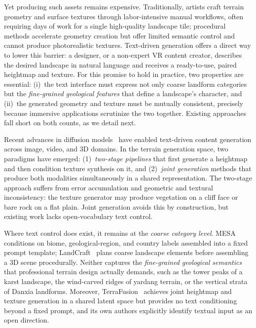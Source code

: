 \documentclass[review]{vgtc}                 %
\begin{document}
Yet producing such assets remains expensive.
Traditionally, artists craft terrain geometry and surface textures through labor-intensive manual workflows, often requiring days of work for a single high-quality landscape tile; procedural methods accelerate geometry creation but offer limited semantic control and cannot produce photorealistic textures.
Text-driven generation offers a direct way to lower this barrier: a designer, or a non-expert VR content creator, describes the desired landscape in natural language and receives a ready-to-use, paired heightmap and texture.
For this promise to hold in practice, two properties are essential: (i)~the text interface must express not only coarse landform categories but the \emph{fine-grained geological features} that define a landscape's character, and (ii)~the generated geometry and texture must be mutually consistent, precisely because immersive applications scrutinize the two together.
Existing approaches fall short on both counts, as we detail next.

Recent advances in diffusion models~\cite{DDPM:2020,LDM:2022} have enabled text-driven content generation across image, video, and 3D domains.
In the terrain generation space, two paradigms have emerged:
(1)~\emph{two-stage pipelines} that first generate a heightmap and then condition texture synthesis on it, and
(2)~\emph{joint generation} methods that produce both modalities simultaneously in a shared representation.
The two-stage approach suffers from error accumulation and geometric and textural inconsistency: the texture generator may produce vegetation on a cliff face or bare rock on a flat plain.
Joint generation avoids this by construction, but existing work lacks open-vocabulary text control.

Where text control does exist, it remains at the \emph{coarse category level}.
MESA~\cite{MESA:2025} conditions on biome, geological-region, and country labels assembled into a fixed prompt template; LandCraft~\cite{LandCraft:2026} plans coarse landscape elements before assembling a 3D scene procedurally.
Neither captures the \emph{fine-grained geological semantics} that professional terrain design actually demands, such as the tower peaks of a karst landscape, the wind-carved ridges of yardang terrain, or the vertical strata of Danxia landforms.
Moreover, TerraFusion~\cite{TerraFusion:2025} achieves joint heightmap and texture generation in a shared latent space but provides no text conditioning beyond a fixed prompt, and its own authors explicitly identify textual input as an open direction.
\end{document}
